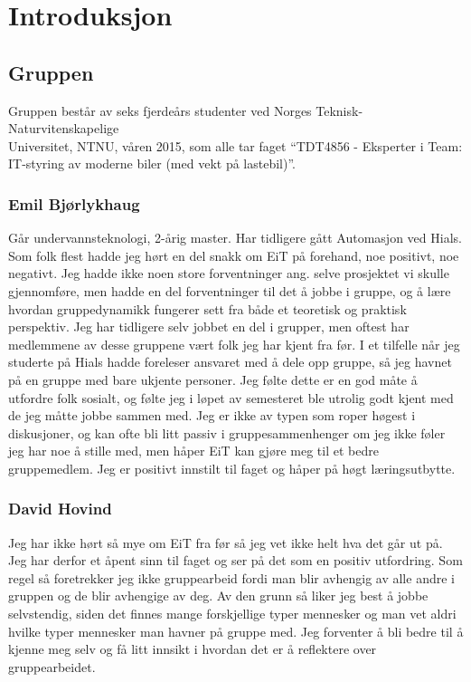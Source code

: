 \chapter{Introduksjon}
\section{Gruppen} 
Gruppen består av seks fjerdeårs studenter ved Norges Teknisk-
Naturvitenskapelige\\Universitet, NTNU, våren 2015, som alle tar faget ``TDT4856 
- Eksperter i Team: IT-styring av moderne biler (med vekt på lastebil)''.

\subsection*{Emil Bjørlykhaug}
Går undervannsteknologi, 2-årig master. Har tidligere gått Automasjon ved Hials.
Som folk flest hadde jeg hørt en del snakk om EiT på forehand, noe positivt, noe negativt. 
Jeg hadde ikke noen store forventninger ang. selve prosjektet vi skulle gjennomføre,
 men hadde en del forventninger til det å jobbe i gruppe, og å lære hvordan gruppedynamikk 
fungerer sett fra både et teoretisk og praktisk perspektiv. Jeg har tidligere selv jobbet 
en del i grupper, men oftest har medlemmene av desse gruppene vært folk jeg har kjent 
fra før. I et tilfelle når jeg studerte på Hials hadde foreleser ansvaret med å dele opp gruppe, 
så jeg havnet på en gruppe med bare ukjente personer. Jeg følte dette er en god måte å 
utfordre folk sosialt, og følte jeg i løpet av semesteret ble utrolig godt kjent med de jeg 
måtte jobbe sammen med.
Jeg er ikke av typen som roper høgest i diskusjoner, og kan ofte bli litt passiv i 
gruppesammenhenger om jeg ikke føler jeg har noe å stille med, men håper 
EiT kan gjøre meg til et bedre gruppemedlem. Jeg er positivt innstilt til faget 
og håper på høgt læringsutbytte.

\subsection*{David Hovind} Jeg har ikke hørt så mye om EiT fra før så jeg vet ikke helt hva det går ut på. 
Jeg har derfor et åpent sinn til faget og ser på det som en positiv utfordring. 
Som regel så foretrekker jeg ikke gruppearbeid fordi man blir avhengig av alle andre i gruppen og de blir avhengige av deg. 
Av den grunn så liker jeg best å jobbe selvstendig, siden det finnes mange forskjellige typer mennesker og man vet aldri 
hvilke typer mennesker man havner på gruppe med. Jeg forventer å bli bedre til å kjenne meg selv og få litt innsikt i 
hvordan det er å reflektere over gruppearbeidet.

